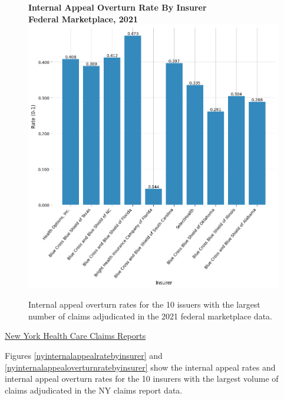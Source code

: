 \documentclass[12pt, a4paper,twoside,parskip=full]{report}
\theoremstyle{plain} %
\theoremstyle{definition} %
\theoremstyle{remark} %
\numberwithin{equation}{chapter}
\begin{document}
	
		\begin{figure}[h!]
			\centering
			\textbf{Internal Appeal Overturn Rate By Insurer}\\
			\textbf{Federal Marketplace, 2021}\\
			\includegraphics[width=.8\columnwidth]{images/cms_puf/internal_appeal_overturn_rate_by_insurer.png}
			\caption{Internal appeal overturn rates for the 10 issuers with the largest number of claims adjudicated in the 2021 federal marketplace data.}
			\label{federalinternalappealoverturnratebyinsurer}
		\end{figure}
	
		\clearpage
		
		\underline{New York Health Care Claims Reports}
		
		Figures \ref{nyinternalappealratebyinsurer} and \ref{nyinternalappealoverturnratebyinsurer} show the internal appeal rates and internal appeal overturn rates for the 10 insurers with the largest volume of claims adjudicated in the NY claims report data.
		
\end{document}
